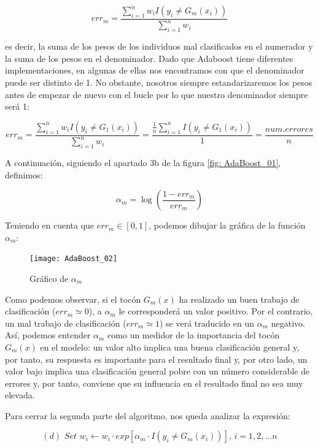 \documentclass[12pt,twoside]{article}
\begin{document}
\begin{equation*}
err_m = \frac{\sum_{i=1}^{n} w_i I(y_i \neq G_m(x_i))}{\sum_{i=1}^{n} w_i} 
\end{equation*}

\noindent
es decir, la suma de los pesos de los individuos mal clasificados en el numerador y la suma de los pesos en el denominador. Dado que Adaboost tiene diferentes implementaciones, en algunas de ellas nos encontramos con que el denominador puede ser distinto de 1. No obstante, nosotros siempre estandarizaremos los pesos antes de empezar de nuevo con el bucle por lo que nuestro denominador siempre será 1:

\begin{equation*}
err_m = \frac{\sum_{i=1}^{n} w_i I(y_i \neq G_1(x_i))}{\sum_{i=1}^{n} w_i} = \frac{\frac{1}{n} \sum_{i=1}^{n}I(y_i \neq G_1(x_i))}{1} = \frac{num.errores}{n}
\end{equation*}

A continuación, siguiendo el apartado 3b de la figura \ref{fig: AdaBoost_01}, definimos:

\begin{equation*}
\alpha _m = \log \left( \frac{1 - err_m}{err_m} \right)
\end{equation*}

Teniendo en cuenta que $err_m \in [0, 1]$, podemos dibujar la gráfica de la función $\alpha_m$:

\begin{figure}[h]
\centering
\texttt{[image: AdaBoost\_02]}
\caption{Gráfico de $\alpha_m$}
\label{fig: AdaBoost_02}
\end{figure}

Como podemos observar, si el tocón $G_m(x)$ ha realizado un buen trabajo de clasificación ($err_m \simeq 0$), a $\alpha_m$ le corresponderá un valor positivo. Por el contrario, un mal trabajo de clasificación ($err_m \simeq 1$) se verá traducido en un $\alpha_m$ negativo. Así, podemos entender $\alpha_m$ como un medidor de la importancia del tocón $G_m(x)$ en el modelo: un valor alto implica una buena clasificación general y, por tanto, su respuesta es importante para el resultado final y, por otro lado, un valor bajo implica una clasificación general pobre con un número considerable de errores y, por tanto, conviene que su influencia en el resultado final no sea muy elevada.

Para cerrar la segunda parte del algoritmo, nos queda analizar la expresión:

\begin{equation*}
(d) \, \, Set \, \, w_i \longleftarrow w_i \cdot exp[\alpha_m \cdot I(y_i \neq G_m(x_i))], \, i = 1, 2, \dots n 
\end{equation*}
\end{document}
